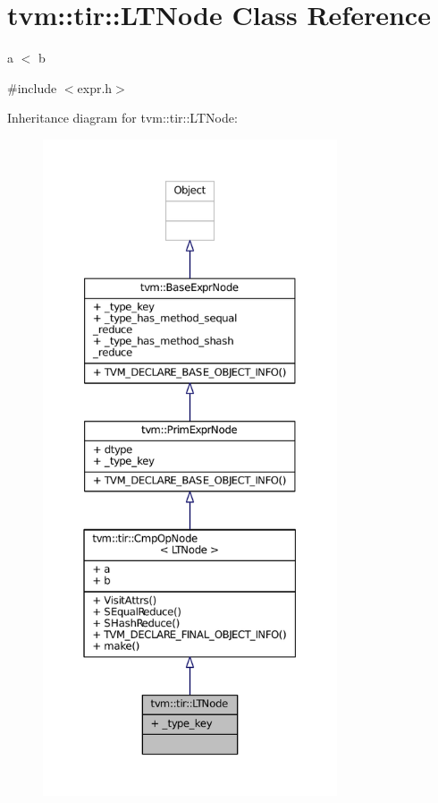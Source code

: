 \hypertarget{classtvm_1_1tir_1_1LTNode}{}\section{tvm\+:\+:tir\+:\+:L\+T\+Node Class Reference}
\label{classtvm_1_1tir_1_1LTNode}


a $<$ b  




{\ttfamily \#include $<$expr.\+h$>$}



Inheritance diagram for tvm\+:\+:tir\+:\+:L\+T\+Node\+:
\nopagebreak
\begin{figure}[H]
\begin{center}
\leavevmode
\includegraphics[height=550pt]{classtvm_1_1tir_1_1LTNode__inherit__graph}
\end{center}
\end{figure}


